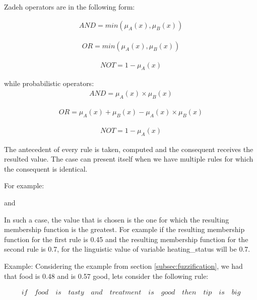 Zadeh operators are in the following form:

\begin{align}
AND = min(\mu_{A}(x), \mu_{B}(x))
\end{align}

\begin{align}
OR = min(\mu_{A}(x), \mu_{B}(x))
\end{align}

\begin{align}
NOT = 1 - \mu_{A}(x)
\end{align}

while probabilistic operators:
\begin{align}
AND = \mu_{A}(x) \times \mu_{B}(x)
\end{align}

\begin{align}
OR = \mu_{A}(x) + \mu_{B}(x) - \mu_{A}(x) \times \mu_{B}(x)
\end{align}

\begin{align}
NOT = 1 - \mu_{A}(x)
\end{align}

\qquad The antecedent of every rule is taken, computed and the consequent receives the resulted value.
The case can present itself when we have multiple rules for which the consequent is identical. \par
For example: \par
{}\par
and \par
{} \par
In such a case, the value that is chosen is the one for which the resulting membership function is the
greatest. For example if the resulting membership function for the first rule is 0.45 and the resulting
membership function for the second rule is 0.7, for the linguistic value  of variable
heating\_status will be 0.7.

Example: Considering the example from section \ref{subsec:fuzzification}, we had that food is 0.48 
and  is 0.57 good, lets consider the following rule: \par
\begin{align}
if \quad food \quad is \quad tasty \quad and \quad treatment \quad is \quad good \quad then \quad tip \quad is
\quad big
\end{align}

